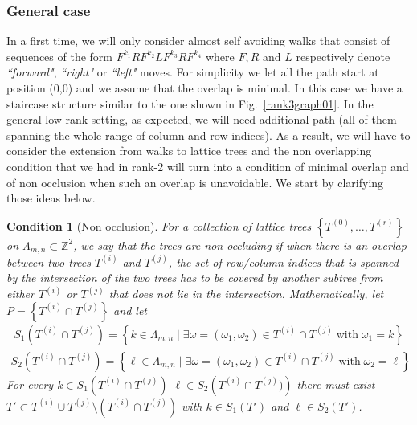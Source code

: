 \documentclass[12pt]{article}
\newtheorem{condition}{Condition}
\begin{document}
\subsubsection{\label{generalCase}General case}

In a first time, we will only consider almost self avoiding walks that consist of sequences of the form $F^{k_1} R F^{k_2} L F^{k_3} R F^{k_4} $ where $F,  R$ and $L$ respectively denote \emph{``forward"}, \emph{``right"} or \emph{``left"} moves.  For simplicity we let all the path start at position (0,0) and we assume that the overlap is minimal. 
In this case we have a staircase structure similar to the one shown in Fig.~\ref{rank3graph01}.  In the general low rank setting, as expected, we will need additional path (all of them spanning the whole range of column and row indices). As a result, we will have to consider the extension from walks to lattice trees and the non overlapping condition that we had in rank-2 will turn into a condition of minimal overlap and of non occlusion when such an overlap is unavoidable.  We start by clarifying those ideas below. 

\begin{condition}[\label{nonOcclusion}Non occlusion]
For a collection of lattice trees $\left\{T^{(0)}, \ldots, T^{(r)}\right\}$ on $\Lambda_{m,n}\subset \mathbb{Z}^2$, we say that the trees are non occluding if when there is an overlap between two trees $T^{(i)}$ and $T^{(j)}$,  the set of row/column indices that is spanned by the intersection of the two trees has to be covered by another subtree from either $T^{(i)}$ or $T^{(j)}$ that does not lie in the intersection. Mathematically,  let $P = \left\{T^{(i)}\cap T^{(j)}\right\}$ and let
\begin{align}
S_1(T^{(i)}\cap T^{(j)}) = \left\{k\in \Lambda_{m,n}\;|\; \exists \omega = (\omega_1, \omega_2)\in T^{(i)}\cap T^{(j)}\; \text{with} \; \omega_1 = k \right\}\end{align} 
\begin{align}
S_2(T^{(i)}\cap T^{(j)}) = \left\{\ell \in \Lambda_{m,n} \;|\; \exists \omega = (\omega_1, \omega_2)\in T^{(i)}\cap T^{(j)}\; \text{with} \; \omega_2 = \ell \right\}\end{align}
For every $k\in  S_1(T^{(i)}\cap T^{(j)})$ $\ell\in  S_2\left(T^{(i)}\cap T^{(j)})\right)$ there must exist $T'\subset T^{(i)}\cup T^{(j)}\setminus (T^{(i)}\cap T^{(j)})$ with $k\in S_1(T')$ and $\ell\in S_2(T')$.
\end{condition}
\end{document}
